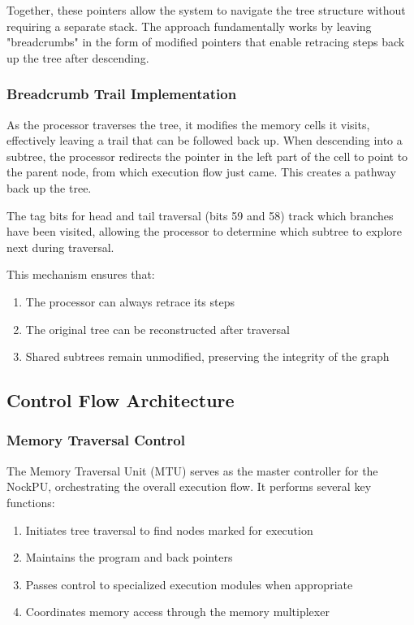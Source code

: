 \documentclass[twoside]{article}
\begin{document}
\noindent
Together, these pointers allow the system to navigate the tree structure without requiring a separate stack. The approach fundamentally works by leaving "breadcrumbs" in the form of modified pointers that enable retracing steps back up the tree after descending.

\subsubsection{Breadcrumb Trail Implementation}



As the processor traverses the tree, it modifies the memory cells it visits, effectively leaving a trail that can be followed back up. When descending into a subtree, the processor redirects the pointer in the left part of the cell to point to the parent node, from which execution flow just came. This creates a pathway back up the tree.

The tag bits for head and tail traversal (bits 59 and 58) track which branches have been visited, allowing the processor to determine which subtree to explore next during traversal.

This mechanism ensures that:
\begin{enumerate}
  \item The processor can always retrace its steps
  \item The original tree can be reconstructed after traversal
  \item Shared subtrees remain unmodified, preserving the integrity of the graph
\end{enumerate}

\subsection{Control Flow Architecture}

\subsubsection{Memory Traversal Control}

The Memory Traversal Unit (MTU) serves as the master controller for the NockPU, orchestrating the overall execution flow. It performs several key functions:

\begin{enumerate}
  \item Initiates tree traversal to find nodes marked for execution
  \item Maintains the program and back pointers
  \item Passes control to specialized execution modules when appropriate
  \item Coordinates memory access through the memory multiplexer
\end{enumerate}
\end{document}

